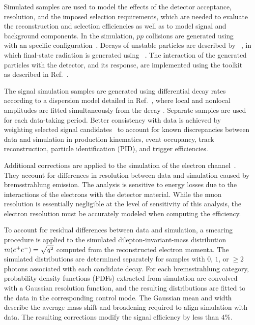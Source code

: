 Simulated samples are used to model the effects of the detector acceptance,
resolution, and the imposed selection requirements, which are needed to evaluate the reconstruction and selection efficiencies as well as to model
signal and background components.  In the simulation, $pp$ collisions are generated using \pythia~\cite{Sjostrand:2007gs,*Sjostrand:2006za} with an
\lhcb specific configuration~\cite{LHCb-PROC-2010-056}. Decays of unstable particles are described by \evtgen~\cite{Lange:2001uf}, in which final-state radiation is
generated using \photos~\cite{davidson2015photos}. The interaction of the generated particles with the detector, and its response, are implemented using the
\geant toolkit~\cite{Allison:2006ve, *Agostinelli:2002hh} as described in Ref.~\cite{LHCb-PROC-2011-006}.

The signal simulation samples are generated using differential decay rates according to a dispersion model detailed in Ref.~\cite{LHCb-PAPER-2024-011}, where local and nonlocal amplitudes are
fitted simultaneously from the decay . Separate samples are used for each data-taking period. Better consistency with data is achieved by weighting
selected signal candidates~\cite{LHCb-PAPER-2022-045} to account for known discrepancies between data and simulation in \Bz production kinematics, event occupancy, track
reconstruction, particle identification (PID), and trigger efficiencies.

Additional corrections are applied to the simulation of the electron channel~\cite{LHCb-PAPER-2024-056}. They account for differences in \qsq resolution between data and simulation caused by bremsstrahlung emission.
The analysis is sensitive to energy losses due to the interactions of the electrons with the detector material. While the muon \qsq resolution is essentially negligible at the level of sensitivity of this analysis, the electron
resolution must be accurately modeled when computing the efficiency.

To account for residual differences between data and simulation, a smearing procedure is applied to the simulated dilepton-invariant-mass distribution
$m(e^+e^-)=\sqrt{{q^2}}$ computed from the reconstructed electron momenta. The simulated distributions are determined separately for samples with $0$, $1$, or $\geq2$
 photons associated with each candidate  decay. For each bremsstrahlung category, probability density functions (PDFs)
extracted from simulation are  convolved with a Gaussian resolution function, and the resulting distributions are fitted to the data in the corresponding \decay{\Bz}{\Kstarz \jpsi} control mode.
The Gaussian mean and width describe the average mass shift and broadening required to align simulation with data.
The resulting corrections modify the signal efficiency by less than $4\%$.


